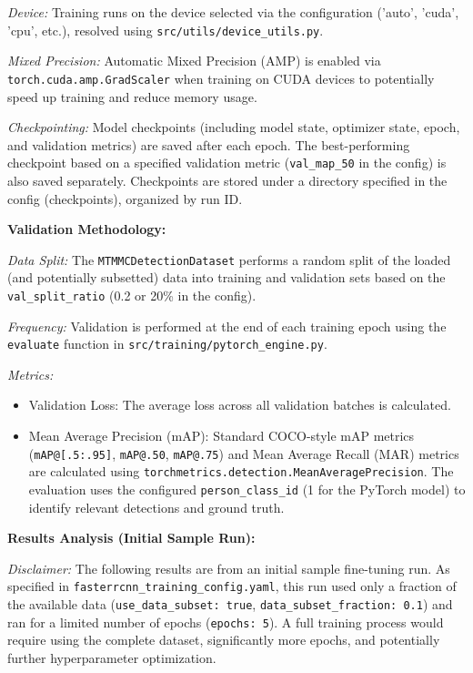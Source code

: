 \textit{Device:} Training runs on the device selected via the configuration ('auto', 'cuda', 'cpu', etc.), resolved using \texttt{src/utils/device\_utils.py}.

\textit{Mixed Precision:} Automatic Mixed Precision (AMP) is enabled via \texttt{torch.cuda.amp.GradScaler} when training on CUDA devices to potentially speed up training and reduce memory usage.

\textit{Checkpointing:} Model checkpoints (including model state, optimizer state, epoch, and validation metrics) are saved after each epoch. The best-performing checkpoint based on a specified validation metric (\texttt{val\_map\_50} in the config) is also saved separately. Checkpoints are stored under a directory specified in the config (checkpoints), organized by run ID.

\textbf{Validation Methodology:}

\textit{Data Split:} The \texttt{MTMMCDetectionDataset} performs a random split of the loaded (and potentially subsetted) data into training and validation sets based on the \texttt{val\_split\_ratio} (0.2 or 20\% in the config).

\textit{Frequency:} Validation is performed at the end of each training epoch using the \texttt{evaluate} function in \texttt{src/training/pytorch\_engine.py}.

\textit{Metrics:}
\begin{itemize}
    \item Validation Loss: The average loss across all validation batches is calculated.
    \item Mean Average Precision (mAP): Standard COCO-style mAP metrics (\texttt{mAP@[.5:.95]}, \texttt{mAP@.50}, \texttt{mAP@.75}) and Mean Average Recall (MAR) metrics are calculated using \texttt{torchmetrics.detection.MeanAveragePrecision}. The evaluation uses the configured \texttt{person\_class\_id} (1 for the PyTorch model) to identify relevant detections and ground truth.
\end{itemize}

\textbf{Results Analysis (Initial Sample Run):}

\textit{Disclaimer:} The following results are from an initial sample fine-tuning run. As specified in \texttt{fasterrcnn\_training\_config.yaml}, this run used only a fraction of the available data (\texttt{use\_data\_subset: true}, \texttt{data\_subset\_fraction: 0.1}) and ran for a limited number of epochs (\texttt{epochs: 5}). A full training process would require using the complete dataset, significantly more epochs, and potentially further hyperparameter optimization.

